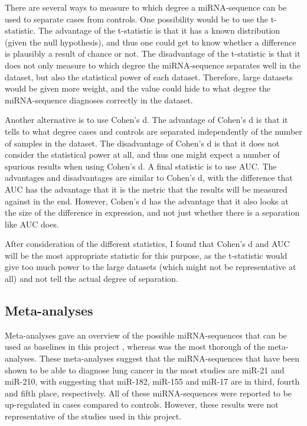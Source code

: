 {{{{{There are several ways to measure to which degree a miRNA-sequence can be used to separate cases from controls. One possibility would be to use the t-statistic. The advantage of the t-statistic is that it has a known distribution (given the null hypothesis), and thus one could get to know whether a difference is plausibly a result of chance or not. The disadvantage of the t-statistic is that it does not only measure to which degree the miRNA-sequence separates well in the dataset, but also the statistical power of each dataset. Therefore, large datasets would be given more weight, and the value could hide to what degree the miRNA-sequence diagnoses correctly in the dataset.

Another alternative is to use Cohen's d. The advantage of Cohen's d is that it tells to what degree cases and controls are separated independently of the number of samples in the dataset. The disadvantage of Cohen's d is that it does not consider the statistical power at all, and thus one might expect a number of spurious results when using Cohen's d. A final statistic is to use AUC. The advantages and disadvantages are similar to Cohen's d, with the difference that AUC has the advantage that it is the metric that the results will be measured against in the end. However, Cohen's d has the advantage that it also looks at the size of the difference in expression, and not just whether there is a separation like AUC does.

After consideration of the different statistics, I found that Cohen's d and AUC will be the most appropriate statistic for this purpose, as the t-statistic would give too much power to the large datasets (which might not be representative at all) and not tell the actual degree of separation.

\subsection{Meta-analyses}
\label{subsec:meta_analyses}
Meta-analyses gave an overview of the possible miRNA-sequences that can be used as baselines in this project \citep{mirna_replicate_sequences,meta-mirna-2,meta-mirna-3,meta-mirna-4}, whereas \citet{mirna_replicate_sequences} was the most thorough of the meta-analyses. These meta-analyses suggest that the miRNA-sequences that have been shown to be able to diagnose lung cancer in the most studies are miR-21 and miR-210, with \citet{mirna_replicate_sequences} suggesting that miR-182, miR-155 and miR-17 are in third, fourth and fifth place, respectively. All of these miRNA-sequences were reported to be up-regulated in cases compared to controls. However, these results were not representative of the studies used in this project. 

}}}}}
